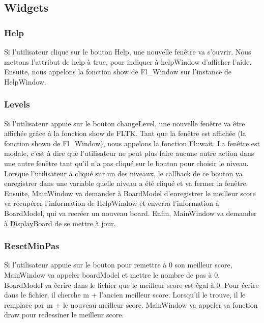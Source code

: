 \documentclass[utf8]{article}
\begin{document}
\begin{large}
\subsection{Widgets}
\subsubsection{Help}
\indent
\par
Si l'utilisateur clique sur le bouton Help, une nouvelle fenêtre va s'ouvrir.
Nous mettons l'attribut de help à true, pour indiquer à helpWindow d'afficher
l'aide. Ensuite, nous appelons la fonction show de Fl\_Window sur l'instance de
HelpWindow.
\par
\subsubsection{Levels}
\indent
\par
Si l'utilisateur appuie sur le bouton changeLevel, une nouvelle fenêtre va être
affichée grâce à la fonction show de FLTK. Tant que la fenêtre est affichée (la
fonction shown de Fl\_Window), nous appelons la fonction Fl::wait. La fenêtre
est modale, c'est à dire que l'utilisateur ne peut plus faire aucune autre
action dans une autre fenêtre tant qu'il n'a pas cliqué sur le bouton pour
choisir le niveau. Lorsque l'utilisateur a cliqué sur un des niveaux, le
callback de ce bouton va enregistrer dans une variable quelle niveau a été
cliqué et va fermer la fenêtre. Ensuite, MainWindow va demander à BoardModel
d'enregistrer le meilleur score va récupérer l'information de HelpWindow et
enverra l'information à BoardModel, qui va recréer un nouveau board. Enfin,
MainWindow va demander à DisplayBoard de se mettre à jour.

\par

\subsubsection{ResetMinPas}
\indent
\par
Si l'utilisateur appuie sur le bouton pour remettre à 0 son meilleur score,
MainWindow va appeler boardModel et mettre le nombre de pas à 0. BoardModel va
écrire dans le fichier que le meilleur score est égal à 0. Pour écrire dans le
fichier, il cherche m + l'ancien meilleur score. Lorsqu'il le trouve, il le
remplace par m + le nouveau meilleur score. MainWindow va appeler sa fonction
draw pour redessiner le meilleur score.
\par


\end{large}
\end{document}
